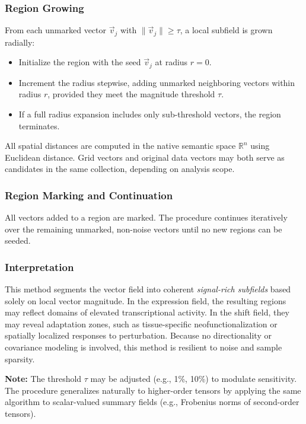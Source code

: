 \documentclass{article}
\begin{document}
\subsubsection{Region Growing}

From each unmarked vector \( \vec{v}_j \) with \( \| \vec{v}_j \| \geq \tau \), a local subfield is grown radially:

\begin{itemize}
    \item Initialize the region with the seed \( \vec{v}_j \) at radius \( r = 0 \).
    \item Increment the radius stepwise, adding unmarked neighboring vectors within radius \( r \), provided they meet the magnitude threshold \( \tau \).
    \item If a full radius expansion includes only sub-threshold vectors, the region terminates.
\end{itemize}

All spatial distances are computed in the native semantic space \( \mathbb{R}^n \) using Euclidean distance. Grid vectors and original data vectors may both serve as candidates in the same collection, depending on analysis scope.

\subsubsection{Region Marking and Continuation}

All vectors added to a region are marked. The procedure continues iteratively over the remaining unmarked, non-noise vectors until no new regions can be seeded.

\subsubsection{Interpretation}

This method segments the vector field into coherent \emph{signal-rich subfields} based solely on local vector magnitude. In the expression field, the resulting regions may reflect domains of elevated transcriptional activity. In the shift field, they may reveal adaptation zones, such as tissue-specific neofunctionalization or spatially localized responses to perturbation. Because no directionality or covariance modeling is involved, this method is resilient to noise and sample sparsity.

\textbf{Note:} The threshold \( \tau \) may be adjusted (e.g., 1\%, 10\%) to modulate sensitivity. The procedure generalizes naturally to higher-order tensors by applying the same algorithm to scalar-valued summary fields (e.g., Frobenius norms of second-order tensors).
\end{document}
